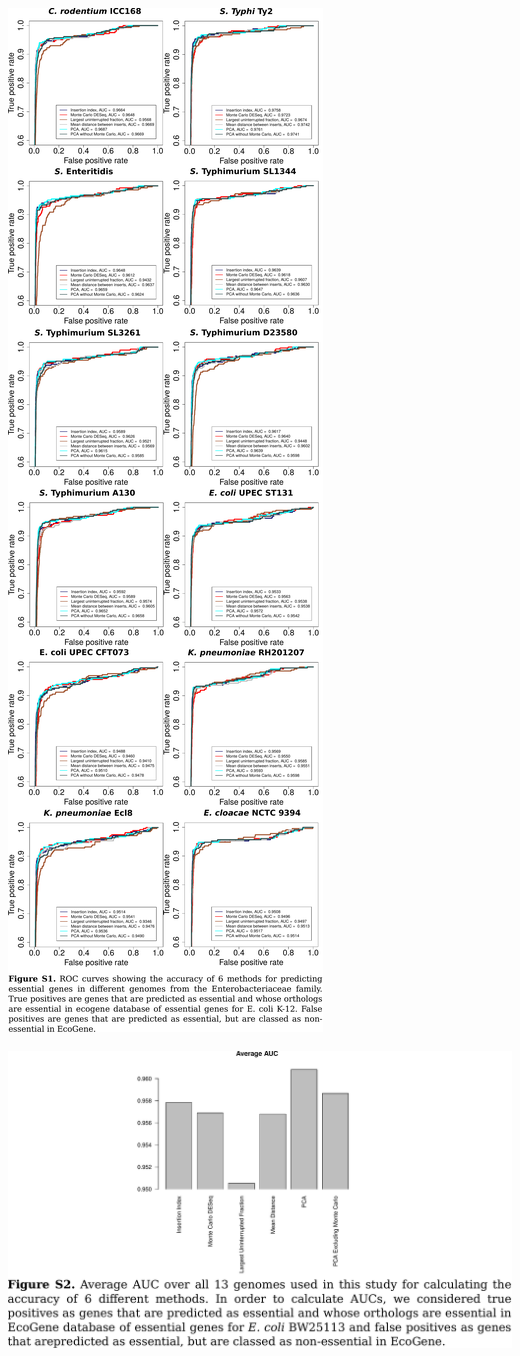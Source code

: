 \documentclass{article}
\newcommand{\Newpage}{\end{preview}\begin{preview}}
\begin{document}
\begin{preview}
\includegraphics{suppl1.pdf}
\Newpage
\includegraphics{suppl2.pdf}

\end{preview}
\end{document}
